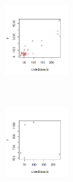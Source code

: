 \documentclass[10pt,a4paper]{article}
\begin{document}
\begin{figure}[t!]
    \centering
    \begin{subfigure}[t]{0.5\textwidth}
        \centering
        \includegraphics[height=1.2in]{pictures/Modell_1/repeat = 30/image_30-8/Rplot}
    \end{subfigure}%
    ~ 
    \begin{subfigure}[t]{0.5\textwidth}
        \centering
        \includegraphics[height=1.2in]{pictures/Modell_1/repeat = 30/image_30-8/Rplot01}
    \end{subfigure}
\end{figure}
\end{document}
